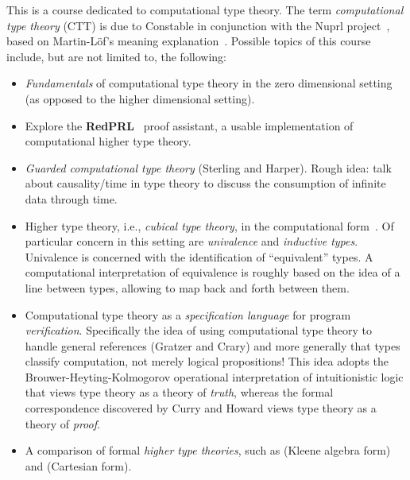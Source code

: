 \documentclass{article}
\newcommand{\redprl}{{\color{red}\textbf{Red}}\textbf{PRL}}
\begin{document}
This is a course dedicated to computational type theory.  The term \emph{computational type
  theory} (CTT) is due to Constable in conjunction with the
Nuprl project~\citep{Constable:86}, based on Martin-L\"{o}f's meaning
explanation~\citep{MartinLof:79}.  Possible topics of this course
include, but are not limited to, the following:
\begin{itemize}
\item \emph{Fundamentals} of computational type theory in the zero
  dimensional setting (as opposed to the higher dimensional setting).
\item Explore the \redprl{}~\citep{redprl} proof assistant, a usable
  implementation of computational higher type theory.
\item \emph{Guarded computational type theory} (Sterling and Harper). Rough
  idea: talk about causality/time in type theory to discuss the
  consumption of infinite data through time.
\item Higher type theory, i.e., \emph{cubical type theory}, in the computational
  form~\citep{Angiuli:chtt1:16,Angiuli:chtt2:16,Angiuli:chtt3:17,Cavallo:18}.  Of particular
  concern in this setting are \emph{univalence} and \emph{inductive types}.  Univalence is
  concerned with the identification of ``equivalent'' types.  A computational interpretation of
  equivalence is roughly based on the idea of a line between types, allowing to map back and forth
  between them.
\item Computational type theory as a \emph{specification language} for program
  \emph{verification}. Specifically the idea of using computational type theory to handle general
  references (Gratzer and Crary) and more generally that types
  classify computation, not merely logical propositions!  This idea adopts the
  Brouwer-Heyting-Kolmogorov operational interpretation of intuitionistic logic that views type
  theory as a theory of \emph{truth}, whereas the formal correspondence discovered by Curry and
  Howard views type theory as a theory of \emph{proof}.
\item A comparison of formal \emph{higher type theories}, such as
  \citet{Cohen:16} (Kleene algebra form) and \citet{Angiuli:cart:17} (Cartesian form).
\end{itemize}
\end{document}
